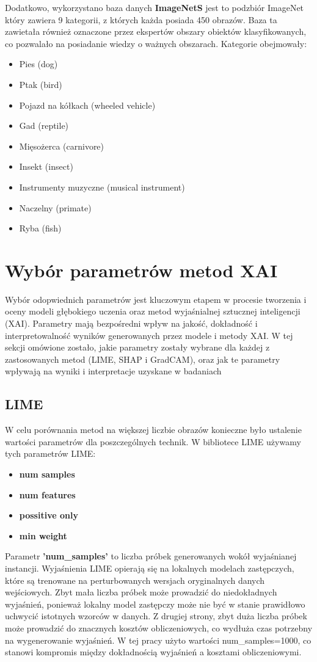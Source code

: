 Dodatkowo, wykorzystano baza danych \textbf{ImageNetS} jest to podzbiór ImageNet który zawiera 9 kategorii, z których każda posiada 450 obrazów.
Baza ta zawietała również oznaczone przez ekspertów obszary obiektów klasyfikowanych, co pozwalało na posiadanie wiedzy o ważnych obszarach.
Kategorie obejmowały:
\begin{itemize}
	\item Pies (dog)
	\item Ptak (bird)
	\item Pojazd na kółkach (wheeled vehicle)
	\item Gad (reptile)
	\item Mięsożerca (carnivore)
	\item Insekt (insect)
	\item Instrumenty muzyczne (musical instrument)
	\item Naczelny (primate)
	\item Ryba (fish)
\end{itemize}

\section*{Wybór parametrów metod XAI}
Wybór odopwiednich parametrów jest kluczowym etapem w procesie tworzenia i oceny modeli głębokiego uczenia oraz metod wyjaśnialnej sztucznej inteligencji (XAI).
Parametry mają bezpośredni wpływ na jakość, dokładność i interpretowalność wyników generowanych przez modele i metody XAI.
W tej sekcji omówione zostało, jakie parametry zostały wybrane dla każdej z zastosowanych metod (LIME, SHAP i GradCAM), oraz jak te parametry wpływają na wyniki i interpretacje uzyskane w badaniach

\subsection*{LIME}
W celu porównania metod na większej liczbie obrazów konieczne było ustalenie wartości parametrów dla poszczególnych technik.
W bibliotece LIME używamy tych parametrów LIME:
\begin{itemize}
	\item \textbf{num samples}
	\item \textbf{num features}
	\item \textbf{possitive only}
	\item \textbf{min weight}
\end{itemize}

Parametr \textbf{'num\_samples'} to liczba próbek generowanych wokół wyjaśnianej instancji.
Wyjaśnienia LIME opierają się na lokalnych modelach zastępczych, które są trenowane na perturbowanych wersjach oryginalnych danych wejściowych.
Zbyt mała liczba próbek może prowadzić do niedokładnych wyjaśnień, ponieważ lokalny model zastępczy może nie być w stanie prawidłowo uchwycić istotnych wzorców w danych.
Z drugiej strony, zbyt duża liczba próbek może prowadzić do znacznych kosztów obliczeniowych, co wydłuża czas potrzebny na wygenerowanie wyjaśnień.
W tej pracy użyto wartości num\_samples=1000, co stanowi kompromis między dokładnością wyjaśnień a kosztami obliczeniowymi.

